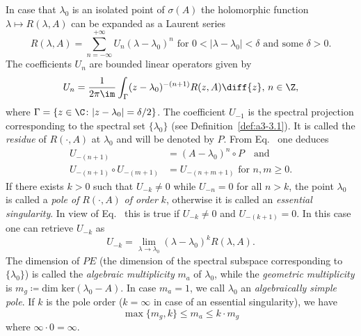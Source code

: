 \begin{example}\label{ex:a3-3.6}%

In case that $\lambda_{0}$ is an isolated point of\/ $\sigma(A)$ the holomorphic function $\lambda \mapsto R(\lambda,A)$ can be expanded as a Laurent series
\[
R(\lambda,A) = \sum_{n=-\infty}^{+\infty} U_{n}(\lambda - \lambda_{0})^{n} \text{ for } 0 < |\lambda - \lambda_{0}| < \delta \text{ and some } \delta > 0 .
\]
The coefficients $U_{n}$ are bounded linear operators given by
\begin{equation}\label{eq:a3-3.1}
	U_{n} = \frac{1}{2\pi\im }\int_{\Gamma} (z - \lambda_{0})^{-(n+1)}R(z,A)  \diff{z}, \, n \in \Z ,
\end{equation}
where $\Gamma = \{z \in \C \colon |z - \lambda_{0}| = \delta/2\}$.
The coefficient $U_{-1}$ is the spectral projection corresponding to the spectral set $\{\lambda_{0}\}$ (see Definition~\ref{def:a3-3.1}).
It is called the \emph{residue} of\/ $R(\cdot,A)$ at $\lambda_{0}$ and will be denoted by $P$.
From Eq.~ one deduces
\begin{equation}\label{eq:a3-3.2}
\begin{split}
U_{-(n+1)} &= (A - \lambda_{0})^{n} \circ P \quad \text{and} \\
U_{-(n+1)} \circ U_{-(m+1)} &= U_{-(n+m+1)} \text{ for } n, m \geq 0 .  
\end{split}
\end{equation}
If there exists $k > 0$ such that $U_{-k} \neq 0$ while $U_{-n} = 0$ for all $n > k$, the point $\lambda_{0}$ is called a \emph{pole of} $R(\cdot,A)$ \emph{of order} $k$, otherwise it is called an \emph{essential singularity}. 
In view of Eq.~ this is true if\/ $U_{-k} \neq 0$ and $U_{-(k+1)} = 0$.
In this case one can retrieve $U_{-k}$ as
\begin{equation}\label{eq:a3-3.3}
U_{-k} = \lim_{\lambda \to \lambda_{0}}(\lambda - \lambda_{0})^{k}R(\lambda,A) .
\end{equation}
The dimension of\/ $PE$ (\ie the dimension of the spectral subspace corresponding to $\{\lambda_{0}\}$) is called the \emph{algebraic multiplicity} 
$m_{a}$ of\/ $\lambda_{0}$, while the \emph{geometric multiplicity} 
is $m_{g} \coloneqq \text{dim ker}(\lambda_{0} - A)$.
In case $m_{a} = 1$, we call $\lambda_{0}$ an \emph{algebraically simple pole}.
If\/ $k$ is the pole order ($k = \infty$ in case of an essential singularity), we have
\begin{equation}\label{eq:a3-3.4}
	\max\{m_{g},k\} \leq m_{a} \leq k \cdot m_{g}
\end{equation}
where $\infty \cdot 0 = \infty$.


\end{example}
